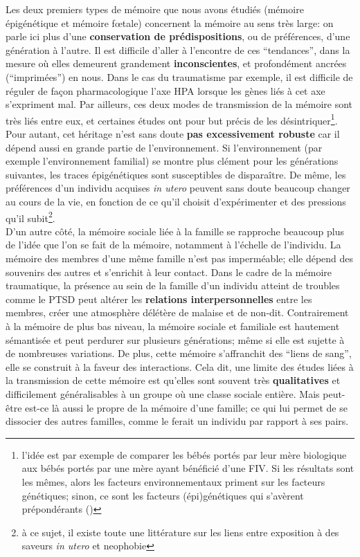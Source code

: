 \documentclass[french]{article}
\begin{document}
			Les deux premiers types de mémoire que nous avons étudiés (mémoire épigénétique et mémoire fœtale) concernent la mémoire au sens très large: on parle ici plus d'une \textbf{conservation de prédispositions}, ou de préférences, d'une génération à l'autre.  Il est difficile d'aller à l'encontre de ces ``tendances'', dans la mesure où elles demeurent grandement \textbf{inconscientes}, et profondément ancrées (``imprimées'') en nous. Dans le cas du traumatisme par exemple, il est difficile de réguler de façon pharmacologique l'axe HPA lorsque les gènes liés à cet axe s'expriment mal. Par ailleurs, ces deux modes de transmission de la mémoire sont très liés entre eux, et certaines études ont pour but précis de les désintriquer\footnote{l'idée est par exemple de comparer les bébés portés par leur mère biologique aux bébés portés par une mère ayant bénéficié d'une FIV. Si les résultats sont les mêmes, alors les facteurs environnementaux priment sur les facteurs génétiques; sinon, ce sont les facteurs (épi)génétiques qui s'avèrent prépondérants (\cite{rice2009})}. Pour autant, cet héritage n'est sans doute \textbf{pas excessivement robuste} car il dépend aussi en grande partie de l'environnement. Si l'environnement (par exemple l'environnement familial) se montre plus clément pour les générations suivantes, les traces épigénétiques sont susceptibles de disparaître. De même, les préférences d'un individu acquises \textit{in utero} peuvent sans doute beaucoup changer au cours de la vie, en fonction de ce qu'il choisit d'expérimenter et des pressions qu'il subit\footnote{à ce sujet, il existe toute une littérature sur les liens entre exposition à des saveurs \textit{in utero} et neophobie}.\\
			
			D'un autre côté, la mémoire sociale liée à la famille se rapproche beaucoup plus de l'idée que l'on se fait de la mémoire, notamment à l'échelle de l'individu. La mémoire des membres d'une même famille n'est pas imperméable; elle dépend des souvenirs des autres et s'enrichit à leur contact. Dans le cadre de la mémoire traumatique, la présence au sein de la famille d'un individu atteint de troubles comme le PTSD peut altérer les \textbf{relations interpersonnelles} entre les membres, créer une atmosphère délétère de malaise et de non-dit. Contrairement à la mémoire de plus bas niveau, la mémoire sociale et familiale est hautement sémantisée et peut perdurer sur plusieurs générations; même si elle est sujette à de nombreuses variations. De plus, cette mémoire s'affranchit des ``liens de sang'', elle se construit à la faveur des interactions. Cela dit, une limite des études liées à la transmission de cette mémoire est qu'elles sont souvent très \textbf{qualitatives} et difficilement généralisables à un groupe où une classe sociale entière. Mais peut-être est-ce là aussi le propre de la mémoire d'une famille; ce qui lui permet de se dissocier des autres familles, comme le ferait un individu par rapport à ses pairs.\\
			
\end{document}

